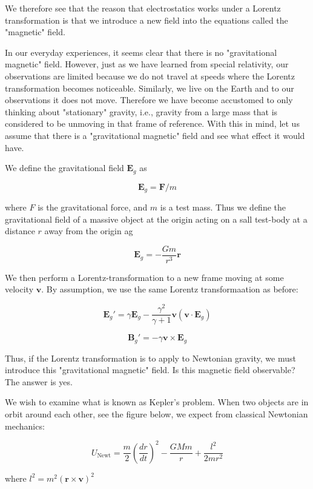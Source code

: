 \documentclass {article}
\renewcommand\vec{\mathbf}
\begin{document}
We therefore see that the reason that electrostatics works under a Lorentz transformation is that we introduce a new field into the equations called the "magnetic" field.

In our everyday experiences, it seems clear that there is no "gravitational magnetic" field. However, just as we have learned from special relativity, our observations are limited because we do not travel at speeds where the Lorentz transformation becomes noticeable. Similarly, we live on the Earth and to our observations it does not move. Therefore we have become accustomed to only thinking about "stationary" gravity, i.e., gravity from a large mass that is considered to be unmoving in that frame of reference. With this in mind, let us assume that there is a "gravitational magnetic" field and see what effect it would have.

We define the gravitational field $\vec E_g $ as

$$ \vec E_g = \vec F / m $$

where $F$ is the gravitational force, and $m$ is a test mass. Thus we define the gravitational field of a massive object at the origin acting on a sall test-body at a distance $r$ away from the origin ag

$$\vec E_g = - \frac {Gm} {r^3} \vec r $$

We then perform a Lorentz-transformation to a new frame moving at some velocity $\vec v$. By assumption, we use the same Lorentz transformaation as before:

$$\vec E_g' = \gamma \vec E_g - \frac {\gamma^2} {\gamma + 1} \vec v (\vec v \cdot \vec E_g) $$

$$ \vec B_g' = - \gamma \vec v \times \vec E_g$$

Thus, if the Lorentz transformation is to apply to Newtonian gravity, we must introduce this "gravitational magnetic" field. Is this magnetic field observable? The answer is yes.

We wish to examine what is known as  Kepler's problem. When two objects are in orbit around each other, see the figure below, we expect from classical Newtonian mechanics:

$$ U_{\text{Newt}} = \frac m 2 (\frac {dr} {dt})^2 - \frac {GMm} r + \frac {l^2} {2mr^2}$$

where $l^2 = m^2 (\vec r \times \vec v)^2$
\end{document}
